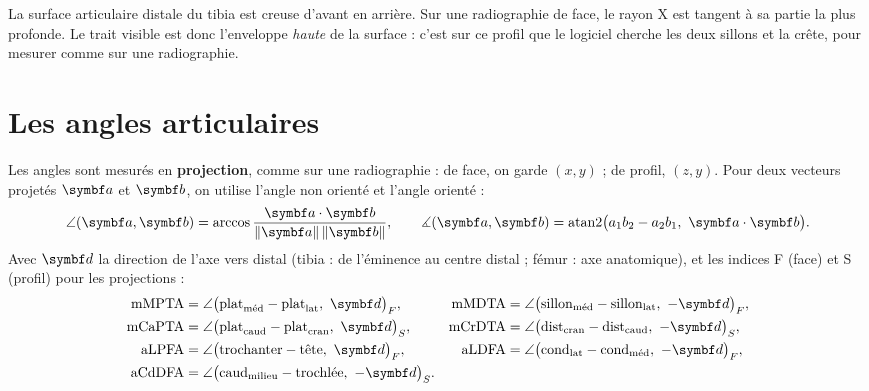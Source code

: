 
\begin{attention}[title={La cochlée vue de face}]
La surface articulaire distale du tibia est creuse d'avant en arrière. Sur une radiographie de face, le rayon X est
tangent à sa partie la plus profonde. Le trait visible est donc l'enveloppe \emph{haute} de la surface : c'est sur ce
profil que le logiciel cherche les deux sillons et la crête, pour mesurer comme sur une radiographie.
\end{attention}

\section{Les angles articulaires}
\label{sec:angles}

Les angles sont mesurés en \textbf{projection}, comme sur une radiographie : de face, on garde $(x, y)$ ; de profil,
$(z, y)$. Pour deux vecteurs projetés $\vb{a}$ et $\vb{b}$, on utilise l'angle non orienté et l'angle orienté :
\begin{equation}
  \angle(\vb{a}, \vb{b}) = \arccos\frac{\vb{a}\cdot\vb{b}}{\norm{\vb{a}}\,\norm{\vb{b}}},
  \qquad
  \measuredangle(\vb{a}, \vb{b}) = \atantwo\bigl(a_1 b_2 - a_2 b_1,\ \vb{a}\cdot\vb{b}\bigr).
\end{equation}
Avec $\vb{d}$ la direction de l'axe vers distal (tibia : de l'éminence au centre distal ; fémur : axe anatomique), et
les indices F (face) et S (profil) pour les projections :
\begin{align}
  \mathrm{mMPTA} &= \angle\bigl(\text{plat}_{\text{méd}} - \text{plat}_{\text{lat}},\ \vb{d}\bigr)_F, &
  \mathrm{mMDTA} &= \angle\bigl(\text{sillon}_{\text{méd}} - \text{sillon}_{\text{lat}},\ -\vb{d}\bigr)_F, \\
  \mathrm{mCaPTA} &= \angle\bigl(\text{plat}_{\text{caud}} - \text{plat}_{\text{cran}},\ \vb{d}\bigr)_S, &
  \mathrm{mCrDTA} &= \angle\bigl(\text{dist}_{\text{cran}} - \text{dist}_{\text{caud}},\ -\vb{d}\bigr)_S, \\
  \mathrm{aLPFA} &= \angle\bigl(\text{trochanter} - \text{tête},\ \vb{d}\bigr)_F, &
  \mathrm{aLDFA} &= \angle\bigl(\text{cond}_{\text{lat}} - \text{cond}_{\text{méd}},\ -\vb{d}\bigr)_F, \\
  \mathrm{aCdDFA} &= \angle\bigl(\text{caud}_{\text{milieu}} - \text{trochlée},\ -\vb{d}\bigr)_S. & &
\end{align}

